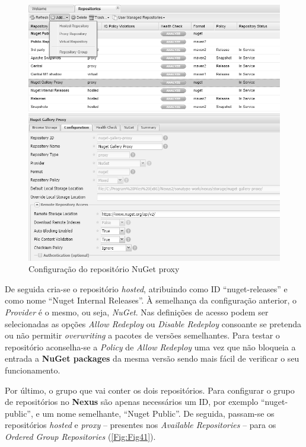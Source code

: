 \begin{figure}[hbt!]
\centering
\includegraphics[width=0.9\linewidth]{Cap5/NexusOSSProxy.png}
\caption{Configuração do repositório NuGet proxy}
\label{Fig:Fig40}
\end{figure}

\hspace{1cm}De seguida cria-se o repositório \textit{hosted}, atribuindo como ID ``nuget-releases'' e como nome ``Nuget Internal Releases''. À semelhança da configuração anterior, o \textit{Provider} é o mesmo, ou seja, \textit{NuGet}. Nas definições de acesso podem ser selecionadas as opções \textit{Allow Redeploy} ou \textit{Disable Redeploy} consoante se pretenda ou não permitir \textit{overwriting} a pacotes de versões semelhantes. Para testar o repositório aconselha-se a \textit{Policy} de \textit{Allow Redeploy} uma vez que não bloqueia a entrada a \textbf{NuGet packages} da mesma versão sendo mais fácil de verificar o seu funcionamento.

\hspace{1cm}Por último, o grupo que vai conter os dois repositórios. Para configurar o grupo de repositórios no \textbf{Nexus} são apenas necessários um ID, por exemplo ``nuget-public'', e um nome semelhante, ``Nuget Public''. De seguida, passam-se os repositórios \textit{hosted} e \textit{proxy} -- presentes nos \textit{Available Repositories} -- para os \textit{Ordered Group Repositories} (\ref{Fig:Fig41}). 


